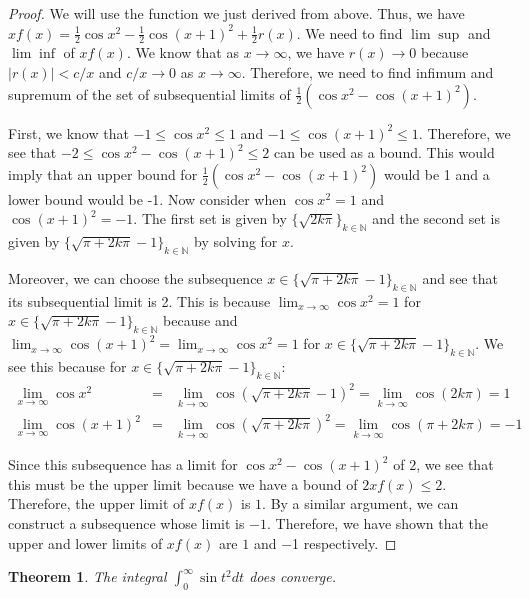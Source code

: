 \documentclass[psamsfonts]{amsart}
\newtheorem{thm}{Theorem}[section]
\theoremstyle{definition}
\theoremstyle{remark}
\numberwithin{equation}{section}
\begin{document}
\begin{proof}
We will use the function we just derived from above. Thus, we have $xf(x) = \frac{1}{2} \cos x^2 - \frac{1}{2} \cos(x+1)^2 + \frac{1}{2} r(x)$. We need to find $\lim \sup$ and $\lim \inf$ of $x f(x)$. We know that as $x \to \infty$, we have $r(x) \to 0$ because $|r(x)| < c/x$ and $c/x \to 0$ as $x \to \infty$. Therefore, we need to find infimum and supremum of the set of subsequential limits of $\frac{1}{2} ( \cos x^2 - \cos (x+1)^2 )$.

First, we know that $-1 \leq \cos x^2 \leq 1$ and $-1 \leq \cos (x+1)^2 \leq 1$. Therefore, we see that $-2 \leq \cos x^2 - \cos (x+1)^2 \leq 2$ can be used as a bound. This would imply that an upper bound for $\frac{1}{2} (\cos x^2 - \cos (x+1)^2 )$ would be 1 and a lower bound would be -1. Now consider when $\cos x^2 = 1$ and $\cos (x+1)^2 = -1$. The first set is given by $ \{\sqrt{2 k \pi} \}_{k \in \mathbb{N}}$ and the second set is given by $\{ \sqrt{\pi + 2 k \pi} - 1 \}_{k \in \mathbb{N}}$ by solving for $x$. 

Moreover, we can choose the subsequence $x \in \{ \sqrt{\pi + 2k \pi} -1 \}_{k \in \mathbb{N}}$ and see that its subsequential limit is 2. This is because $\lim_{x \to \infty} \cos x^2 = 1$ for $x \in \{\sqrt{\pi + 2k \pi} -1  \}_{k \in \mathbb{N}}$ because and $\lim_{x \to \infty} \cos (x+1)^2 = \lim_{x \to \infty} \cos x^2 = 1$ for $x \in \{\sqrt{\pi + 2k \pi} -1  \}_{k \in \mathbb{N}}$. We see this because for $x \in \{\sqrt{\pi + 2k \pi} -1 \}_{k \in \mathbb{N}}$:
\begin{eqnarray}
\lim_{x \to \infty} \cos x^2 &=& \lim_{k \to \infty} \cos (\sqrt{\pi + 2 k \pi} - 1)^2 = \lim_{k \to \infty} \cos (2 k \pi) = 1 \\
\lim_{x \to \infty} \cos (x+1)^2 &=& \lim_{k \to \infty} \cos (\sqrt{\pi + 2 k \pi})^2 = \lim_{k \to \infty} \cos(\pi + 2k\pi) = -1
\end{eqnarray}

Since this subsequence has a limit for $\cos x^2 - \cos(x+1)^2$ of $2$, we see that this must be the upper limit because we have a bound of $2 x f(x) \leq 2$. Therefore, the upper limit of $x f(x)$ is $1$. By a similar argument, we can construct a subsequence whose limit is $-1$. Therefore, we have shown that the upper and lower limits of $x f(x)$ are $1$ and $-$1 respectively. 
\end{proof}

\begin{thm}
The integral $\int_0^\infty \sin t^2 dt$ does converge. 
\end{thm}
\end{document}
